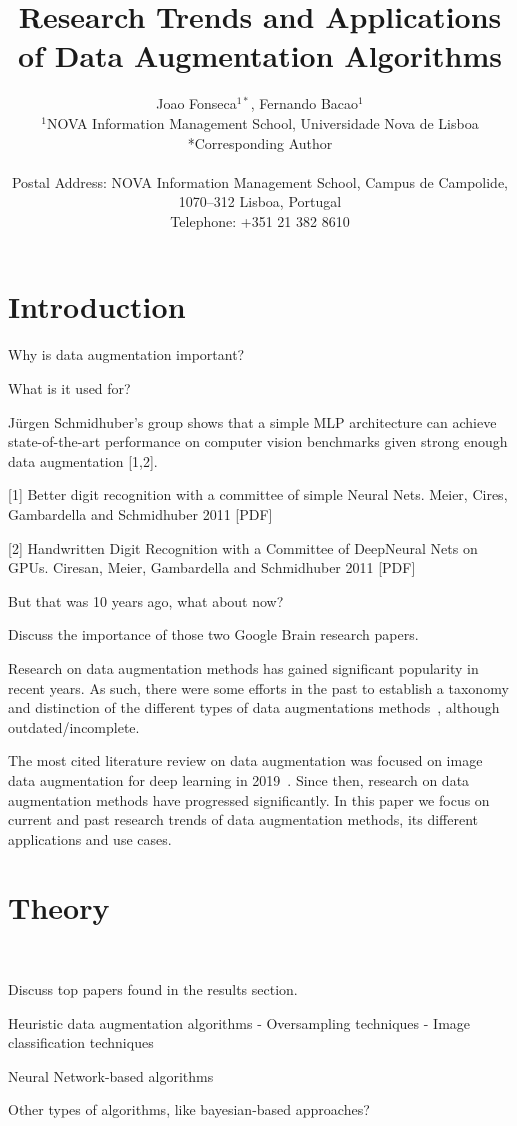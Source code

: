 \documentclass[parskip=full]{scrartcl}
\date{}
\title{%
    Research Trends and Applications of Data Augmentation Algorithms
}
\author{%
	Joao Fonseca\(^{1*}\), Fernando Bacao\(^{1}\)
	\\
	\small{\(^{1}\)NOVA Information Management School, Universidade Nova de Lisboa}
	\\
	\small{*Corresponding Author}
	\\
	\\
	\small{Postal Address: NOVA Information Management School, Campus de
    Campolide, 1070--312 Lisboa, Portugal}
	\\
	\small{Telephone: +351 21 382 8610}
}
\begin{document}
\maketitle

\section{Introduction}

Why is data augmentation important?

What is it used for?

Jürgen Schmidhuber's group shows that a simple MLP architecture can achieve
state-of-the-art performance on computer vision benchmarks given strong enough
data augmentation [1,2].

[1] Better digit recognition with a committee of simple Neural Nets. Meier,
Cires, Gambardella and Schmidhuber 2011 [PDF]

[2] Handwritten Digit Recognition with a Committee of DeepNeural Nets on GPUs.
Ciresan, Meier, Gambardella and Schmidhuber 2011 [PDF]

But that was 10 years ago, what about now?

Discuss the importance of those two Google Brain research papers.

Research on data augmentation methods has gained significant popularity in
recent years. As such, there were some efforts in the past to establish a
taxonomy and distinction of the different types of data augmentations
methods~\cite{Shorten2019}, although outdated/incomplete.

The most cited literature review on data augmentation was focused on image
data augmentation for deep learning in 2019~\cite{Shorten2019}. Since then,
research on data augmentation methods have progressed significantly. In this
paper we focus on current and past research trends of data augmentation
methods, its different applications and use cases.

\section{Theory}~\label{sec:theory}

Discuss top papers found in the results section.

Heuristic data augmentation algorithms
- Oversampling techniques
- Image classification techniques

Neural Network-based algorithms

Other types of algorithms, like bayesian-based approaches?
\end{document}
